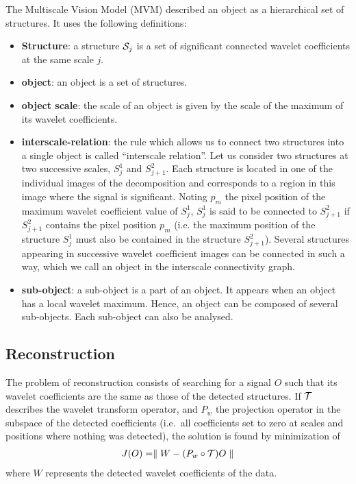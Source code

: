 The Multiscale Vision Model (MVM) \cite{ima:bijaoui95,ima:rue97} 
described  an object as a hierarchical set of structures.
It uses the following definitions:
\begin{itemize}
\item {\bf Structure}: a structure ${\cal S}_j$ is a set of significant
 connected wavelet coefficients at the same scale $j$. \\
\item {\bf object}: an object is a set of structures.\\
\item {\bf object scale}: the scale of an object is given by the scale of the
maximum of its wavelet coefficients.\\
\item {\bf interscale-relation}: the rule which  
allows us to connect two structures into a single object
is called ``interscale relation''. Let us consider two structures at two 
successive scales, $S^1_j$ and  $S^2_{j+1}$. Each
structure is located in one of the individual images of the
decomposition and corresponds to a region in this image where the
signal is significant. Noting $p_m$ the pixel position of the maximum
wavelet coefficient value of $S^1_j$, $S^1_j$ is said to be connected to
$S^2_{j+1}$ if $S^2_{j+1}$ contains the pixel position $p_m$ (i.e. the maximum
position of the structure $S^1_j$ must also be contained in the structure 
$S^2_{j+1}$). Several structures
appearing in successive wavelet coefficient images can be connected in
such a way, which we call an object in the interscale connectivity
graph.
\item {\bf sub-object}: a sub-object is a part of an object. It appears when
an object has a local wavelet maximum. Hence, an object can be composed of
several sub-objects. Each sub-object can also be analysed.
\end{itemize}

\subsection{Reconstruction}
The problem of reconstruction \cite{ima:bijaoui95,ima:rue97} 
consists of searching for a signal $O$ such that
its wavelet coefficients are the same as those of the detected
structures. If $\cal T$ describes the wavelet transform operator, and $P_w$ the
projection operator in the subspace of the detected coefficients
(i.e.\ all coefficients set to zero at scales and positions where
nothing was detected), the solution is found by minimization of
\begin{eqnarray*}
J(O) = \parallel W - (P_w \circ {\cal T}) O  \parallel
\end{eqnarray*}
where $W$ represents the detected wavelet coefficients of the data.


